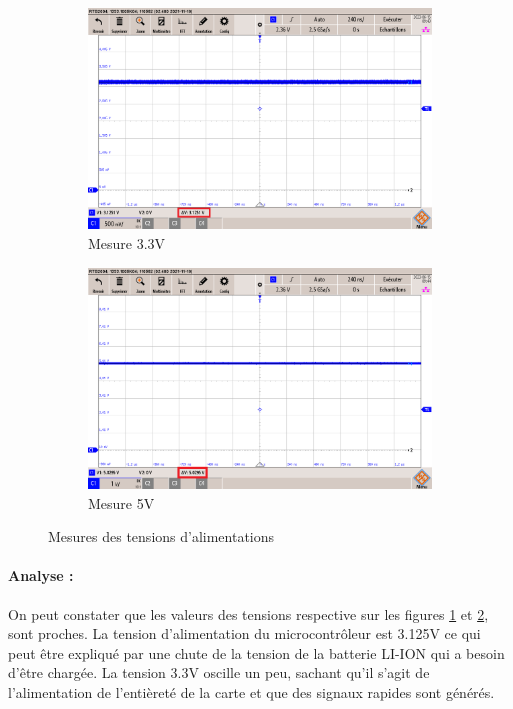 {	\begin{figure}
	\begin{subfigure}{.5\textwidth}
		\centering
		\includegraphics[width=\textwidth]{Mesures/Tension3.3V}
		\caption{Mesure 3.3V}
		\label{fig:Mes3.3V}
	\end{subfigure}
	\begin{subfigure}{.5\textwidth}
		\centering
		\includegraphics[width=\textwidth]{Mesures/Tension5V}
		\caption{Mesure 5V}
		\label{fig:Mes5V}
	\end{subfigure}
	\caption{Mesures des tensions d'alimentations}
	\label{fig:Mesure3.3et5V}
	\end{figure}
	
	\paragraph{Analyse :} On peut constater que les valeurs des tensions respective sur les figures \ref{fig:Mes3.3V} et \ref{fig:Mes5V}, sont proches. La tension d'alimentation du microcontrôleur est 3.125V ce qui peut être expliqué par une chute de la tension de la batterie LI-ION qui a besoin d'être chargée. La tension 3.3V oscille un peu, sachant qu'il s'agit de l'alimentation de l'entièreté de la carte et que des signaux rapides sont générés.
	
}

